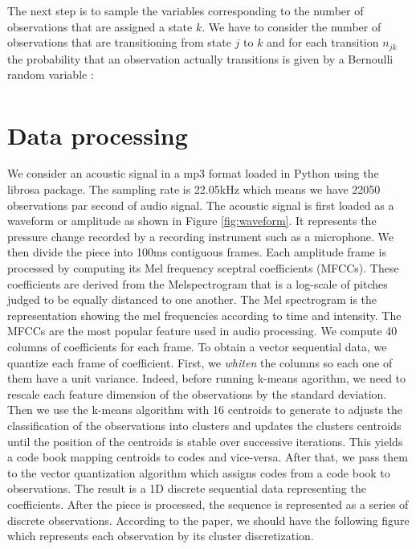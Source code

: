 The next step is to sample the variables corresponding to the number of observations that are assigned a state $k$. We have to consider the number of observations that are transitioning from state $j$ to $k$ and for each transition $n_{jk}$ the probability that an observation actually transitions is given by a Bernoulli random variable : \begin{align*}
	
\end{align*}


\section{Data processing}
We consider an acoustic signal in a mp3 format loaded in Python using the librosa package. The sampling rate is 22.05kHz which means we have 22050 observations par second of audio signal. The acoustic signal is first loaded as a waveform or amplitude as shown in Figure \ref{fig:waveform}. It represents the pressure change recorded by a recording instrument such as a microphone. We then divide the piece into 100ms contiguous frames. Each amplitude frame is processed by computing its Mel frequency sceptral coefficients (MFCCs). These coefficients are derived from the Melspectrogram that is a log-scale of pitches judged to be equally distanced to one another. The Mel spectrogram is the representation showing the mel frequencies according to time and intensity. The MFCCs are the most popular feature used in audio processing. We compute 40 columns of coefficients for each frame. To obtain a vector sequential data, we quantize each frame of coefficient. First, we \textit{whiten} the columns so each one of them have a unit variance. Indeed, before running k-means agorithm, we need to rescale each feature dimension of the observations by the standard deviation. Then we use the k-means algorithm with 16 centroids to generate to adjusts the classification of the observations into clusters and updates the clusters centroids until the position of the centroids is stable over successive iterations. This yields a code book mapping centroids to codes and vice-versa. After that, we pass them to the vector quantization algorithm which assigns codes from a code book to observations. The result is a 1D discrete sequential data representing the coefficients. After the piece is processed, the sequence is represented as a series of discrete observations. According to the paper, we should have the following figure which represents each observation by its cluster discretization. 
